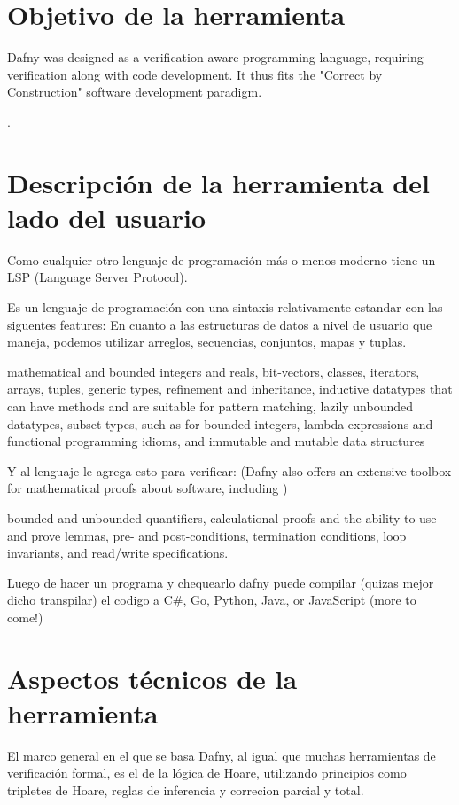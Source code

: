 \documentclass[runningheads]{llncs}
\begin{document}
\section{Objetivo de la herramienta}
Dafny was designed as a verification-aware programming language, requiring verification along with code development. It thus fits the "Correct by Construction" software development paradigm.

.

\section{Descripción de la herramienta del lado del usuario}
Como cualquier otro lenguaje de programación más o menos moderno tiene un LSP (Language Server Protocol).

Es un lenguaje de programación con una sintaxis relativamente estandar con las siguentes features:
En cuanto a las estructuras de datos a nivel de usuario que maneja, podemos utilizar arreglos, secuencias, conjuntos, mapas y tuplas.

mathematical and bounded integers and reals, bit-vectors, classes, iterators, arrays, tuples, generic types, refinement and inheritance,
inductive datatypes that can have methods and are suitable for pattern matching,
lazily unbounded datatypes,
subset types, such as for bounded integers,
lambda expressions and functional programming idioms,
and immutable and mutable data structures

Y al lenguaje le agrega esto para verificar: (Dafny also offers an extensive toolbox for mathematical proofs about software, including
)

bounded and unbounded quantifiers,
calculational proofs and the ability to use and prove lemmas,
pre- and post-conditions, termination conditions, loop invariants, and read/write specifications.

Luego de hacer un programa y chequearlo dafny puede compilar (quizas mejor dicho transpilar) el codigo a C\#, Go, Python, Java, or JavaScript (more to come!)

\section{Aspectos técnicos de la herramienta}
El marco general en el que se basa Dafny, al igual que muchas herramientas de verificación formal, es el de la lógica de Hoare,
utilizando principios como tripletes de Hoare, reglas de inferencia y correcion parcial y total.
\end{document}
